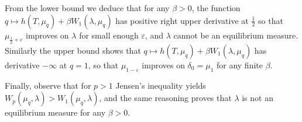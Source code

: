 \documentclass[10pt]{amsart}
\theoremstyle{definition}\newtheorem{defi}[theo]{Definition}\newtheorem{rema}[theo]{Remark}\newtheorem{exam}[theo]{Example}\newtheorem{exem}[theo]{Example}\newtheorem{nota}[theo]{Notation}
\theoremstyle{plain}
\theoremstyle{plain}
\newcommand*\8{\infty}
\begin{document}
From the lower bound we deduce that for any $\beta>0$, the function $q\mapsto h(T,\mu_q) + \beta W_1(\lambda,\mu_q)$ has positive right upper derivative at $\frac12$ so that $\mu_{\frac12+\varepsilon}$ improves on $\lambda$ for small enough $\varepsilon$, and $\lambda$ cannot be an equilibrium measure. Similarly the upper bound shows that $q\mapsto h(T,\mu_q) + \beta W_1(\lambda,\mu_q)$ has derivative $-\infty$ at $q=1$, so that $\mu_{1-\varepsilon}$ improves on $\delta_0=\mu_1$ for any finite $\beta$.

Finally, observe that for $p>1$ Jensen's inequality yields $W_p(\mu_q,\lambda)>W_1(\mu_q,\lambda)$, and the same reasoning proves that $\lambda$ is not an equilibrium measure for any $\beta>0$.

\vspace*{10pt}
\end{document}
